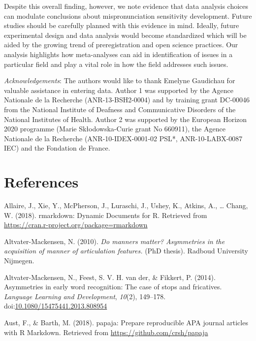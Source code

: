 \documentclass[man]{apa6}
\theoremstyle{definition}
\theoremstyle{definition}
\theoremstyle{definition}
\theoremstyle{remark}
\begin{document}
Despite this overall finding, however, we note evidence that data
analysis choices can modulate conclusions about mispronunciation
sensitivity development. Future studies should be carefully planned with
this evidence in mind. Ideally, future experimental design and data
analysis would become standardized which will be aided by the growing
trend of preregistration and open science practices. Our analysis
highlights how meta-analyses can aid in identification of issues in a
particular field and play a vital role in how the field addresses such
issues.

\newpage

\emph{Acknowledgements}: The authors would like to thank Emelyne
Gaudichau for valuable assistance in entering data. Author 1 was
supported by the Agence Nationale de la Recherche (ANR-13-BSH2-0004) and
by training grant DC-00046 from the National Institute of Deafness and
Communicative Disorders of the National Institutes of Health. Author 2
was supported by the European Horizon 2020 programme (Marie
Skłodowska-Curie grant No 660911), the Agence Nationale de la Recherche
(ANR-10-IDEX-0001-02 PSL*, ANR-10-LABX-0087 IEC) and the Fondation de
France.

\newpage

\section{References}\label{references}

\begingroup
\setlength{\parindent}{-0.5in} \setlength{\leftskip}{0.5in}

\hypertarget{refs}{}
\hypertarget{ref-RMarkdown}{}
Allaire, J., Xie, Y., McPherson, J., Luraschi, J., Ushey, K., Atkins,
A., \ldots{} Chang, W. (2018). rmarkdown: Dynamic Documents for R.
Retrieved from \url{https://cran.r-project.org/package=rmarkdown}

\hypertarget{ref-Altvater2010}{}
Altvater-Mackensen, N. (2010). \emph{Do manners matter? Asymmetries in
the acquisition of manner of articulation features.} (PhD thesis).
Radboud University Nijmegen.

\hypertarget{ref-Altvater2014}{}
Altvater-Mackensen, N., Feest, S. V. H. van der, \& Fikkert, P. (2014).
Asymmetries in early word recognition: The case of stops and fricatives.
\emph{Language Learning and Development}, \emph{10}(2), 149--178.
doi:\href{https://doi.org/10.1080/15475441.2013.808954}{10.1080/15475441.2013.808954}

\hypertarget{ref-papaja}{}
Aust, F., \& Barth, M. (2018). papaja: Prepare reproducible APA journal
articles with R Markdown. Retrieved from
\url{https://github.com/crsh/papaja}
\end{document}
